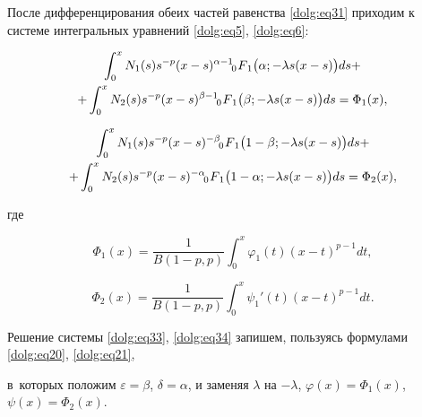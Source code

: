 После дифференцирования обеих частей равенства \eqref{dolg:eq31} приходим к системе интегральных уравнений \eqref{dolg:eq5}, \eqref{dolg:eq6}:

\begin{multline}

\int _0^x N_1(s) s^{-p} (x-s)^{\alpha-1}  \,\,

F_{\hspace{-4mm}0 \hspace{3mm}1} \bigl(\alpha;-\lambda s (x-s)\bigr) ds + 

\\

\label{dolg:eq33}

+ \int _0^x N_2(s) s^{-p} (x-s)^{\beta-1}  \,\,

F_{\hspace{-4mm}0 \hspace{3mm}1} \bigl(\beta;-\lambda s (x-s)\bigr) ds = \Phi_1(x),

\end{multline}

\begin{multline}

\int _0^x N_1(s) s^{-p} (x-s)^{-\beta}  \,\,

F_{\hspace{-4mm}0 \hspace{3mm}1} \bigl(1-\beta;-\lambda s (x-s)\bigr) ds + 

\\

\label{dolg:eq34}

+ \int _0^x N_2(s) s^{-p} (x-s)^{-\alpha}  \,\,

F_{\hspace{-4mm}0 \hspace{3mm}1} \bigl(1-\alpha;-\lambda s (x-s)\bigr) ds = \Phi_2(x),

\end{multline}

где

$$ \Phi_1(x) = \frac{1}{B(1-p,p)}\int _0^x \varphi_1(t) (x-t)^{p-1} dt, $$

$$ \Phi_2(x) = \frac{1}{B(1-p,p)}\int _0^x {\psi_1}'(t) (x-t)^{p-1} dt. $$



Решение системы \eqref{dolg:eq33}, \eqref{dolg:eq34} запишем, пользуясь формулами \eqref{dolg:eq20}, \eqref{dolg:eq21}, 

в~которых положим $\varepsilon=\beta$, $\delta=\alpha$, и заменяя $\lambda$ на $-\lambda$, $\varphi(x)=\Phi_1(x)$, $\psi(x)=\Phi_2(x)$. 


